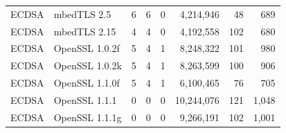 \begin{table}[]
\begin{tabular}{llrrrrrr}
    ECDSA              & mbedTLS 2.5              & 6                 & 6                 & 0              & 4,214,946   & 48      & 689   \\
    ECDSA              & mbedTLS 2.15             & 4                 & 4                 & 0              & 4,192,558   & 102     & 680   \\
    ECDSA              & OpenSSL 1.0.2f           & 5                 & 4                 & 1              & 8,248,322   & 101     & 980   \\
    ECDSA              & OpenSSL 1.0.2k           & 5                 & 4                 & 1              & 8,263,599   & 100     & 906   \\
    ECDSA              & OpenSSL 1.1.0f           & 5                 & 4                 & 1              & 6,100,465   & 76      & 705   \\
    ECDSA              & OpenSSL 1.1.1            & 0                 & 0                 & 0              & 10,244,076  & 121     & 1,048 \\
    ECDSA              & OpenSSL 1.1.1g           & 0                 & 0                 & 0              & 9,266,191   & 102     & 1,001 \\


\end{tabular}
\end{table}
